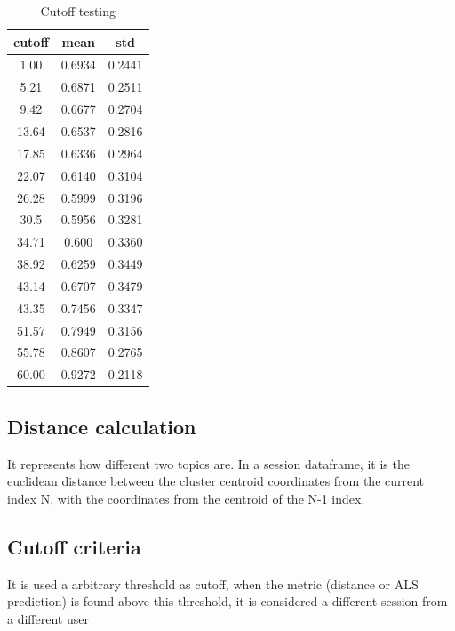 \documentclass[ecp,tc,english]{iiufrgs}
\begin{document}
        \begin{table}[!ht]
            \centering
            \begin{tabular}{ |c|c|c| } 
                \hline
                cutoff & mean & std \\
                \hline 
                1.00 & 0.6934 & 0.2441 \\ 
                5.21 & 0.6871 & 0.2511 \\ 
                9.42 & 0.6677 & 0.2704 \\ 
                13.64 & 0.6537 & 0.2816 \\ 
                17.85 & 0.6336 & 0.2964 \\ 
                22.07 & 0.6140 & 0.3104 \\ 
                26.28 & 0.5999 & 0.3196 \\ 
                30.5 & 0.5956 & 0.3281 \\ 
                34.71 & 0.600 & 0.3360 \\ 
                38.92 & 0.6259 & 0.3449 \\ 
                43.14 & 0.6707 & 0.3479 \\ 
                43.35 & 0.7456 & 0.3347 \\ 
                51.57 & 0.7949 & 0.3156 \\ 
                55.78 & 0.8607 & 0.2765 \\ 
                60.00 & 0.9272 & 0.2118 \\ 
                \hline
            \end{tabular}
            \caption{Cutoff testing}
            \label{tab:cutoff_sample}
        \end{table}
        
        \subsection{Distance calculation}
        It represents how different two topics are.
        In a session dataframe, it is the euclidean distance between the cluster centroid coordinates from the current index N, with the coordinates from the centroid of the N-1 index. 
        
        \subsection{Cutoff criteria}
        It is used a arbitrary threshold as cutoff, when the metric (distance or ALS prediction) is found above this threshold, it is considered a different session from a different user   
        
\end{document}
